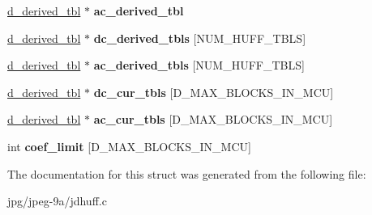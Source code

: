 \begin{DoxyCompactItemize}
\item 
\hypertarget{structhuff__entropy__decoder_adbbf18c6aa3065d9bcf6bf33079733e0}{\hyperlink{structd__derived__tbl}{d\+\_\+derived\+\_\+tbl} $\ast$ {\bfseries ac\+\_\+derived\+\_\+tbl}}\label{structhuff__entropy__decoder_adbbf18c6aa3065d9bcf6bf33079733e0}

\item 
\hypertarget{structhuff__entropy__decoder_a277328a6f93b55616bd86b0056098c65}{\hyperlink{structd__derived__tbl}{d\+\_\+derived\+\_\+tbl} $\ast$ {\bfseries dc\+\_\+derived\+\_\+tbls} \mbox{[}N\+U\+M\+\_\+\+H\+U\+F\+F\+\_\+\+T\+B\+L\+S\mbox{]}}\label{structhuff__entropy__decoder_a277328a6f93b55616bd86b0056098c65}

\item 
\hypertarget{structhuff__entropy__decoder_a19edd8c7e80bfe34c21e6fe35ef90cce}{\hyperlink{structd__derived__tbl}{d\+\_\+derived\+\_\+tbl} $\ast$ {\bfseries ac\+\_\+derived\+\_\+tbls} \mbox{[}N\+U\+M\+\_\+\+H\+U\+F\+F\+\_\+\+T\+B\+L\+S\mbox{]}}\label{structhuff__entropy__decoder_a19edd8c7e80bfe34c21e6fe35ef90cce}

\item 
\hypertarget{structhuff__entropy__decoder_a63725587525df86501d2a632152c01c0}{\hyperlink{structd__derived__tbl}{d\+\_\+derived\+\_\+tbl} $\ast$ {\bfseries dc\+\_\+cur\+\_\+tbls} \mbox{[}D\+\_\+\+M\+A\+X\+\_\+\+B\+L\+O\+C\+K\+S\+\_\+\+I\+N\+\_\+\+M\+C\+U\mbox{]}}\label{structhuff__entropy__decoder_a63725587525df86501d2a632152c01c0}

\item 
\hypertarget{structhuff__entropy__decoder_af9d82cc6c9c90aa6bc3d5fc324967d7c}{\hyperlink{structd__derived__tbl}{d\+\_\+derived\+\_\+tbl} $\ast$ {\bfseries ac\+\_\+cur\+\_\+tbls} \mbox{[}D\+\_\+\+M\+A\+X\+\_\+\+B\+L\+O\+C\+K\+S\+\_\+\+I\+N\+\_\+\+M\+C\+U\mbox{]}}\label{structhuff__entropy__decoder_af9d82cc6c9c90aa6bc3d5fc324967d7c}

\item 
\hypertarget{structhuff__entropy__decoder_a28830ac6bc49fafca8325b1ec0472a33}{int {\bfseries coef\+\_\+limit} \mbox{[}D\+\_\+\+M\+A\+X\+\_\+\+B\+L\+O\+C\+K\+S\+\_\+\+I\+N\+\_\+\+M\+C\+U\mbox{]}}\label{structhuff__entropy__decoder_a28830ac6bc49fafca8325b1ec0472a33}

\end{DoxyCompactItemize}


The documentation for this struct was generated from the following file\+:\begin{DoxyCompactItemize}
\item 
jpg/jpeg-\/9a/jdhuff.\+c\end{DoxyCompactItemize}
